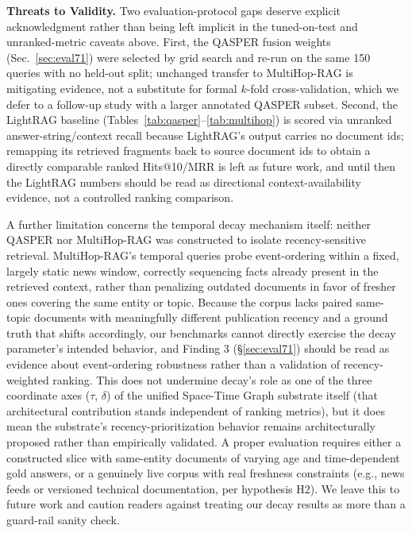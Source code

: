 \documentclass[conference,a4paper]{IEEEtran}
\begin{document}
\textbf{Threats to Validity.} Two evaluation-protocol gaps deserve explicit acknowledgment rather than being left implicit in the tuned-on-test and unranked-metric caveats above. First, the QASPER fusion weights (Sec.~\ref{sec:eval71}) were selected by grid search and re-run on the same 150 queries with no held-out split; unchanged transfer to MultiHop-RAG is mitigating evidence, not a substitute for formal $k$-fold cross-validation, which we defer to a follow-up study with a larger annotated QASPER subset. Second, the LightRAG baseline (Tables~\ref{tab:qasper}--\ref{tab:multihop}) is scored via unranked answer-string/context recall because LightRAG's output carries no document ids; remapping its retrieved fragments back to source document ids to obtain a directly comparable ranked Hits@10/MRR is left as future work, and until then the LightRAG numbers should be read as directional context-availability evidence, not a controlled ranking comparison.

A further limitation concerns the temporal decay mechanism itself: neither QASPER nor MultiHop-RAG was constructed to isolate recency-sensitive retrieval. MultiHop-RAG's temporal queries probe event-ordering within a fixed, largely static news window, correctly sequencing facts already present in the retrieved context, rather than penalizing outdated documents in favor of fresher ones covering the same entity or topic. Because the corpus lacks paired same-topic documents with meaningfully different publication recency and a ground truth that shifts accordingly, our benchmarks cannot directly exercise the decay parameter's intended behavior, and Finding 3 (\S\ref{sec:eval71}) should be read as evidence about event-ordering robustness rather than a validation of recency-weighted ranking. This does not undermine decay's role as one of the three coordinate axes ($\tau$, $\delta$) of the unified Space-Time Graph substrate itself (that architectural contribution stands independent of ranking metrics), but it does mean the substrate's recency-prioritization behavior remains architecturally proposed rather than empirically validated. A proper evaluation requires either a constructed slice with same-entity documents of varying age and time-dependent gold answers, or a genuinely live corpus with real freshness constraints (e.g., news feeds or versioned technical documentation, per hypothesis H2). We leave this to future work and caution readers against treating our decay results as more than a guard-rail sanity check.
\end{document}

